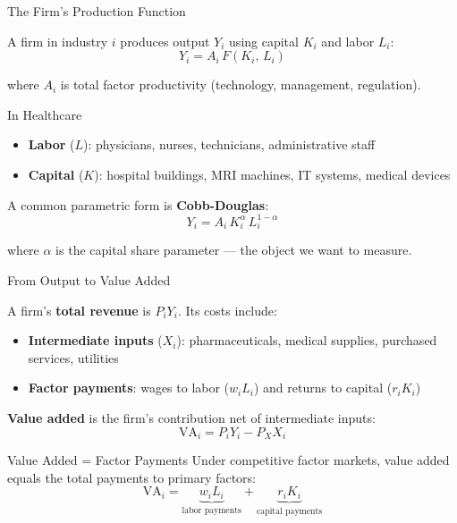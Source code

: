 \begin{frame}{The Firm's Production Function}

A firm in industry $i$ produces output $Y_i$ using capital $K_i$ and labor $L_i$:
%
\begin{equation*}
    Y_i = A_i \, F(K_i, \, L_i)
\end{equation*}

where $A_i$ is total factor productivity (technology, management, regulation).

\begin{block}{In Healthcare}
\begin{itemize}
    \item \textbf{Labor} ($L$): physicians, nurses, technicians, administrative staff
    \item \textbf{Capital} ($K$): hospital buildings, MRI machines, IT systems, medical devices
\end{itemize}
\end{block}

A common parametric form is \textbf{Cobb-Douglas}:
%
\begin{equation*}
    Y_i = A_i \, K_i^{\alpha} \, L_i^{1-\alpha}
\end{equation*}

where $\alpha$ is the capital share parameter --- the object we want to measure.

\end{frame}

\begin{frame}{From Output to Value Added}

A firm's \textbf{total revenue} is $P_i Y_i$. Its costs include:
%
\begin{itemize}
    \item \textbf{Intermediate inputs} ($X_i$): pharmaceuticals, medical supplies, purchased services, utilities
    \item \textbf{Factor payments}: wages to labor ($w_i L_i$) and returns to capital ($r_i K_i$)
\end{itemize}

\medskip
\textbf{Value added} is the firm's contribution net of intermediate inputs:
%
\begin{equation*}
    \text{VA}_i = P_i Y_i - P_{X} X_i
\end{equation*}

\begin{alertblock}{Value Added = Factor Payments}
Under competitive factor markets, value added equals the total payments to primary factors:
%
\begin{equation*}
    \text{VA}_i = \underbrace{w_i L_i}_{\text{labor payments}} + \underbrace{r_i K_i}_{\text{capital payments}}
\end{equation*}
\end{alertblock}

\end{frame}

